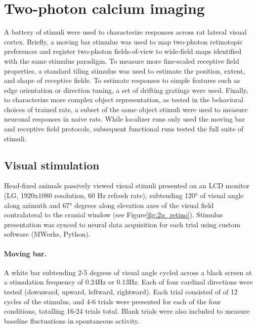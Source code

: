 \section{Two-photon calcium imaging}
A battery of stimuli were used to characterize responses across rat lateral visual cortex. Briefly, a moving bar stimulus was used to map two-photon retinotopic preferences and register two-photon fields-of-view to wide-field maps identified with the same stimulus paradigm. To measure more fine-scaled receptive field properties, a standard tiling stimulus was used to estimate the position, extent, and shape of receptive fields. To estimate responses to simple features such as edge orientation or direction tuning, a set of drifting gratings were used. Finally, to characterize more complex object representation, as tested in the behavioral choices of trained rats, a subset of the same object stimuli were used to measure neuronal responses in naive rats. While localizer runs only used the moving bar and receptive field protocols, subsequent functional runs tested the full suite of stimuli.  

\subsection{Visual stimulation}
Head-fixed animals passively viewed visual stimuli presented on an LCD monitor (LG, 1920x1080 resolution, 60 Hz refresh rate), subtending \ang{120} of visual angle along azimuth and \ang{67} degrees along elevation axes of the visual field contralateral to the cranial window (see Figure\ref{fig:2p_retino}). Stimulus presentation was synced to neural data acquisition for each trial using custom software (MWorks, Python). 

\paragraph{Moving bar.} A white bar subtending 2-5 degrees of visual angle cycled across a black screen at a stimulation frequency of 0.24Hz or 0.13Hz. Each of four cardinal directions were tested (downward, upward, leftward, rightward). Each trial consisted of of 12 cycles of the stimulus, and 4-6 trials were presented for each of the four conditions, totalling 16-24 trials total. Blank trials were also included to measure baseline fluctuations in spontaneous activity.  

